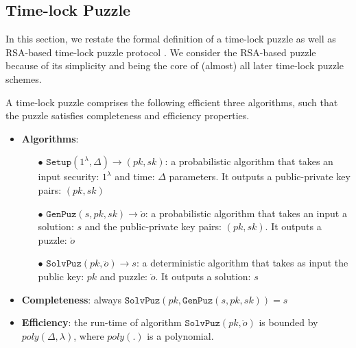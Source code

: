 
\vspace{-3mm}
 
\subsection{ Time-lock  Puzzle}\label{Time-lock-Encryption} In this section, we restate the formal definition of a time-lock puzzle as well as RSA-based  time-lock puzzle protocol \cite{Rivest:1996:TPT:888615}. We consider the RSA-based puzzle because of its simplicity and  being the core of (almost) all later time-lock puzzle schemes.


\begin{definition}\label{Def::Time-lock-Puzzle} A time-lock puzzle comprises the following efficient three algorithms, such that the puzzle satisfies completeness and efficiency properties. 
\begin{itemize}[leftmargin=.37cm]
\item \textbf{Algorithms}:
\begin{itemize}
\item[$\bullet$]$\mathtt{Setup}(1^{\scriptscriptstyle\lambda},\Delta)\rightarrow (pk,sk)$: a probabilistic algorithm that takes an input  security: $1^{\scriptscriptstyle\lambda}$ and time:  $\Delta$ parameters. It outputs a public-private key pairs: $(pk,sk)$

\item[$\bullet$]$\mathtt{GenPuz}(s, pk, sk)\rightarrow \ddot{o}$: a probabilistic algorithm that takes an input a solution: $s$ and the public-private key pairs: $(pk,sk)$. It  outputs a puzzle: $\ddot{o}$

\item[$\bullet$]$\mathtt{SolvPuz}(pk,\ddot{o})\rightarrow s$:  a deterministic algorithm that takes as input  the public key: $pk$ and  puzzle: $\ddot{o}$. It outputs a solution: $s$
\end{itemize}
\item \textbf{Completeness}: always  $\mathtt{SolvPuz}(pk,\mathtt{GenPuz}(s,pk,sk))=s$


\item \textbf{Efficiency}: the run-time of algorithm $\mathtt{SolvPuz}(pk,\ddot{o})$ is bounded by  $poly(\Delta,\lambda)$, where $poly(.)$ is a  polynomial.
\end{itemize}
\end{definition}


